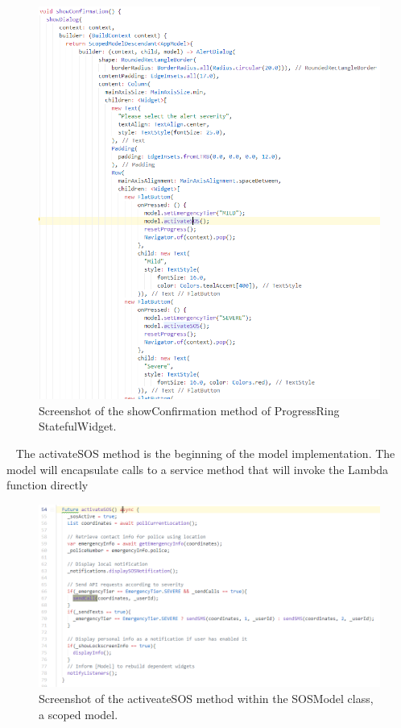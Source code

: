 \documentclass[10pt, a4paper]{article}
\begin{document}
\begin{figure}[H]
\begin{center}
  \includegraphics[scale=1]{code-screenshots/show-confirmation.PNG}
  \caption{Screenshot of the showConfirmation method of ProgressRing StatefulWidget.}
\end{center}
\end{figure}

\par ~ The activateSOS method is the beginning of the model implementation. The model will encapsulate calls to a service method that will invoke the Lambda function directly
\begin{figure}[H]
\begin{center}
  \includegraphics[scale=1]{code-screenshots/activate-sos.PNG}
  \caption{Screenshot of the activeateSOS method within the SOSModel class, a scoped model.}
\end{center}
\end{figure}
\end{document}
